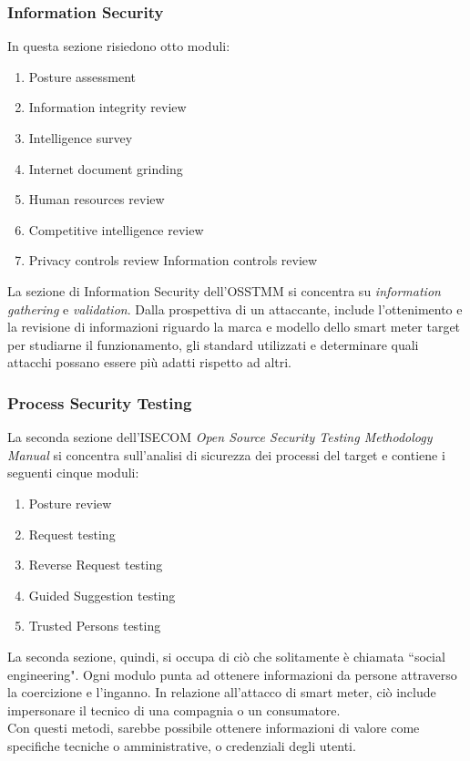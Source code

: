 \subsubsection{Information Security}
In questa sezione risiedono otto moduli:
\begin{enumerate}
	\item Posture assessment
	\item Information integrity review
	\item Intelligence survey
	\item Internet document grinding
	\item Human resources review
	\item Competitive intelligence review
	\item Privacy controls review
	Information controls review
\end{enumerate}
La sezione di Information Security dell'OSSTMM si concentra su \emph{information gathering} e \emph{validation}. Dalla prospettiva di un attaccante, include l'ottenimento e la revisione di informazioni riguardo la marca e modello dello smart meter target per studiarne il funzionamento, gli standard utilizzati e determinare quali attacchi possano essere più adatti rispetto ad altri.


\subsubsection{Process Security Testing}
La seconda sezione dell'ISECOM \emph{Open Source Security Testing Methodology Manual} si concentra sull'analisi di sicurezza dei processi del target e contiene i seguenti cinque moduli:
\begin{enumerate}
	\item Posture review
	\item Request testing
	\item Reverse Request testing
	\item Guided Suggestion testing
	\item Trusted Persons testing
\end{enumerate}

La seconda sezione, quindi, si occupa di ciò che solitamente è chiamata ``social engineering". Ogni modulo punta ad ottenere informazioni da persone attraverso la coercizione e l'inganno. In relazione all'attacco di smart meter, ciò include impersonare il tecnico di una compagnia o un consumatore.\\
Con questi metodi, sarebbe possibile ottenere informazioni di valore come specifiche tecniche o amministrative, o credenziali degli utenti.

